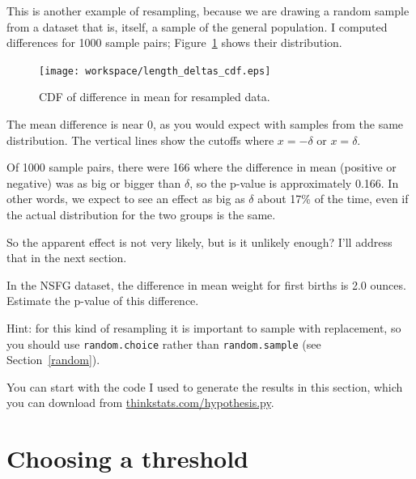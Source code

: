 \documentclass[12pt]{book}
\begin{document}

This is another example of resampling, because we are drawing a
random sample from a dataset that is, itself, a sample of the general
population.  I computed differences for 1000 sample pairs;
Figure~\ref{length_deltas_cdf} shows their distribution.

\begin{figure}
\centerline{\texttt{[image: workspace/length\_deltas\_cdf.eps]}}
\caption{CDF of difference in mean for resampled data.}
\label{length_deltas_cdf}
\end{figure}

The mean difference is near 0, as you would expect with samples
from the same distribution.  The vertical lines show the cutoffs where
$x=-\delta$ or $x=\delta$.

Of 1000 sample pairs, there were 166 where the difference in mean
(positive or negative) was as big or bigger than $\delta$, so the
p-value is approximately 0.166.  In other words, we expect to see an
effect as big as $\delta$ about 17\% of the time, even if the actual
distribution for the two groups is the same.

So the apparent effect is not very likely, but is it unlikely enough?
I'll address that in the next section.

\begin{ex}

In the NSFG dataset, the difference in mean weight for first
births is 2.0 ounces.  Estimate the p-value of this difference.


Hint: for this kind of resampling it is important to sample
with replacement, so you should use {\tt random.choice} rather
than {\tt random.sample} (see Section~\ref{random}).


You can start with the code I used to generate the results in this
section, which you can download from \url{thinkstats.com/hypothesis.py}.


\end{ex}


\section{Choosing a threshold}
\label{threshold}
\end{document}
